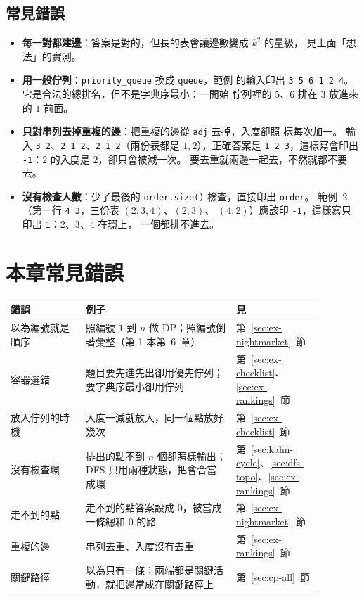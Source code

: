 \subsection{常見錯誤}

\begin{itemize}
\item \textbf{每一對都建邊}：答案是對的，但長的表會讓邊數變成 $k^2$ 的量級，
見上面「想法」的實測。
\item \textbf{用一般佇列}：\texttt{priority\_queue} 換成 \texttt{queue}，範例
的輸入印出 \texttt{3 5 6 1 2 4}。 它是合法的總排名，但不是字典序最小：一開始
佇列裡的 $5$、$6$ 排在 $3$ 放進來的 $1$ 前面。
\item \textbf{只對串列去掉重複的邊}：把重複的邊從 \texttt{adj} 去掉，入度卻照
樣每次加一。 輸入 \texttt{3 2}、\texttt{2 1 2}、\texttt{2 1 2}（兩份表都是
$1, 2$），正確答案是 \texttt{1 2 3}，這樣寫會印出 \texttt{-1}：$2$ 的入度是
$2$，卻只會被減一次。 要去重就兩邊一起去，不然就都不要去。
\item \textbf{沒有檢查人數}：少了最後的 \texttt{order.size()} 檢查，直接印出
\texttt{order}。 範例~2（第一行 \texttt{4 3}，三份表 $(2, 3, 4)$、$(2, 3)$、
$(4, 2)$）應該印 \texttt{-1}，這樣寫只印出 \texttt{1}：$2$、$3$、$4$ 在環上，
一個都排不進去。
\end{itemize}

\section{本章常見錯誤}
\label{sec:dag-pitfalls}

\begin{center}
\begin{tabular}{p{0.22\linewidth}p{0.44\linewidth}p{0.22\linewidth}}
\toprule
錯誤 & 例子 & 見 \\
\midrule
以為編號就是順序 & 照編號 $1$ 到 $n$ 做 DP；照編號倒著彙整（第 1 本第~6~章） &
第~\ref{sec:ex-nightmarket}~節 \\
容器選錯 & 題目要先進先出卻用優先佇列；要字典序最小卻用佇列 &
第~\ref{sec:ex-checklist}、\ref{sec:ex-rankings}~節 \\
放入佇列的時機 & 入度一減就放入，同一個點放好幾次 &
第~\ref{sec:ex-checklist}~節 \\
沒有檢查環 & 排出的點不到 $n$ 個卻照樣輸出；DFS 只用兩種狀態，把會合當成環 &
第~\ref{sec:kahn-cycle}、\ref{sec:dfs-topo}、\ref{sec:ex-rankings}~節 \\
走不到的點 & 走不到的點答案設成 $0$，被當成一條總和 $0$ 的路 &
第~\ref{sec:ex-nightmarket}~節 \\
重複的邊 & 串列去重、入度沒有去重 & 第~\ref{sec:ex-rankings}~節 \\
關鍵路徑 & 以為只有一條；兩端都是關鍵活動，就把邊當成在關鍵路徑上 &
第~\ref{sec:cp-all}~節 \\
\bottomrule
\end{tabular}
\end{center}

